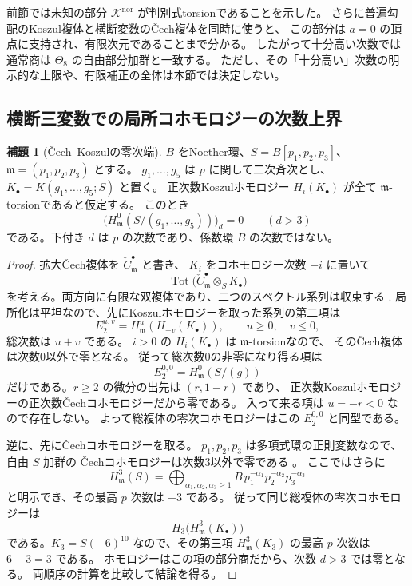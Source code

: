 \documentclass[a4paper,11pt]{ltjsarticle}
\theoremstyle{definition}
\newtheorem{lemma}[theorem]{補題}
\begin{document}
前節では未知の部分 $\mathcal K^{\mathrm{nor}}$ が判別式torsionであることを示した。
さらに普遍勾配のKoszul複体と横断変数の\v{C}ech複体を同時に使うと、
この部分は $a=0$ の頂点に支持され、有限次元であることまで分かる。
したがって十分高い次数では通常商は $\Theta_8$ の自由部分加群と一致する。
ただし、その「十分高い」次数の明示的な上限や、有限補正の全体は本節では決定しない。

\subsection{横断三変数での局所コホモロジーの次数上界}

\begin{lemma}[\v{C}ech--Koszulの零次端]
\label{lem:v17-cech-koszul-normal-degree-bound}
$B$ をNoether環、$S=B[p_1,p_2,p_3]$、
$\mathfrak m=(p_1,p_2,p_3)$ とする。
$g_1,\ldots,g_5$ は $p$ に関して二次斉次とし、
$K_\bullet=K(g_1,\ldots,g_5;S)$ と置く。
正次数Koszulホモロジー $H_i(K_\bullet)$ が全て
$\mathfrak m$-torsionであると仮定する。
このとき
\begin{equation}\label{eq:v17-local-torsion-degree-bound}
 \bigl(H^0_{\mathfrak m}(S/(g_1,\ldots,g_5))\bigr)_d=0
 \qquad(d>3)
\end{equation}
である。下付き $d$ は $p$ の次数であり、係数環 $B$ の次数ではない。
\end{lemma}

\begin{proof}
拡大\v{C}ech複体を $\check C^\bullet_{\mathfrak m}$ と書き、
$K_i$ をコホモロジー次数 $-i$ に置いて
\[
 \operatorname{Tot}
  \bigl(\check C^\bullet_{\mathfrak m}\otimes_S K_\bullet\bigr)
\]
を考える。両方向に有限な双複体であり、二つのスペクトル系列は収束する
\cite[Tag 012X, Lemmas 12.25.1 and 12.25.3]{StacksCechKoszul}.
局所化は平坦なので、先にKoszulホモロジーを取った系列の第二項は
\[
 E_2^{u,v}=H^u_{\mathfrak m}(H_{-v}(K_\bullet)),
 \qquad u\ge0,\quad v\le0,
\]
総次数は $u+v$ である。
$i>0$ の $H_i(K_\bullet)$ は $\mathfrak m$-torsionなので、
その\v{C}ech複体は次数0以外で零となる。
従って総次数0の非零になり得る項は
\[
 E_2^{0,0}=H^0_{\mathfrak m}(S/(g))
\]
だけである。$r\ge2$ の微分の出先は $(r,1-r)$ であり、
正次数Koszulホモロジーの正次数\v{C}echコホモロジーだから零である。
入って来る項は $u=-r<0$ なので存在しない。
よって総複体の零次コホモロジーはこの $E_2^{0,0}$ と同型である。

逆に、先に\v{C}echコホモロジーを取る。
$p_1,p_2,p_3$ は多項式環の正則変数なので、自由 $S$ 加群の
\v{C}echコホモロジーは次数3以外で零である
\cite[Tag 0G6L]{StacksCechKoszul}。
ここではさらに
\[
 H^3_{\mathfrak m}(S)
  =\bigoplus_{\alpha_1,\alpha_2,\alpha_3\ge1}
       B\,p_1^{-\alpha_1}p_2^{-\alpha_2}p_3^{-\alpha_3}
\]
と明示でき、その最高 $p$ 次数は $-3$ である。
従って同じ総複体の零次コホモロジーは
\[
 H_3\bigl(H^3_{\mathfrak m}(K_\bullet)\bigr)
\]
である。$K_3=S(-6)^{10}$ なので、その第三項
$H^3_{\mathfrak m}(K_3)$ の最高 $p$ 次数は $6-3=3$ である。
ホモロジーはこの項の部分商だから、次数 $d>3$ では零となる。
両順序の計算を比較して結論を得る。
\end{proof}
\end{document}
